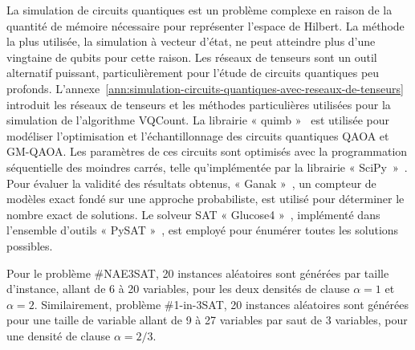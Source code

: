 La simulation de circuits quantiques est un problème complexe en raison de la quantité de mémoire nécessaire pour représenter l'espace de Hilbert. La méthode la plus utilisée, la simulation à vecteur d'état, ne peut atteindre plus d'une vingtaine de qubits pour cette raison. Les réseaux de tenseurs sont un outil alternatif puissant, particulièrement pour l'étude de circuits quantiques peu profonds. L'annexe~\ref{ann:simulation-circuits-quantiques-avec-reseaux-de-tenseurs} introduit les réseaux de tenseurs et les méthodes particulières utilisées pour la simulation de l'algorithme VQCount. La librairie « quimb »~\cite{grayQuimbPythonPackage2018} est utilisée pour modéliser l'optimisation et l'échantillonnage des circuits quantiques QAOA et GM-QAOA. Les paramètres de ces circuits sont optimisés avec la programmation séquentielle des moindres carrés, telle qu'implémentée par la librairie « SciPy »~\cite{virtanenSciPy10Fundamental2020}. Pour évaluer la validité des résultats obtenus, « Ganak »~\cite{sharmaGANAKScalableProbabilistic2019}, un compteur de modèles exact fondé sur une approche probabiliste, est utilisé pour déterminer le nombre exact de solutions. Le solveur SAT « Glucose4 »~\cite{eenExtensibleSATsolver2004,audemardPredictingLearntClauses2009}, implémenté dans l'ensemble d'outils « PySAT »~\cite{ignatievPySATPythonToolkit2018}, est employé pour énumérer toutes les solutions possibles.

Pour le problème \#NAE3SAT, 20 instances aléatoires sont générées par taille d'instance, allant de 6 à 20 variables, pour les deux densités de clause $\alpha=1$ et $\alpha = 2$. Similairement, problème \#1-in-3SAT, 20 instances aléatoires sont générées pour une taille de variable allant de 9 à 27 variables par saut de 3 variables, pour une densité de clause $\alpha = 2/3$. 


